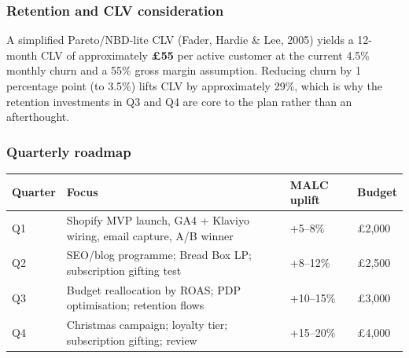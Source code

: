 \documentclass[
  11pt,
]{article}
\begin{document}
\subsubsection{Retention and CLV
consideration}\label{retention-and-clv-consideration}

A simplified Pareto/NBD-lite CLV (Fader, Hardie \& Lee, 2005) yields a
12-month CLV of approximately \textbf{£55} per active customer at the
current 4.5\% monthly churn and a 55\% gross margin assumption. Reducing
churn by 1 percentage point (to 3.5\%) lifts CLV by approximately 29\%,
which is why the retention investments in Q3 and Q4 are core to the plan
rather than an afterthought.

\subsubsection{Quarterly roadmap}\label{quarterly-roadmap}

\begin{longtable}[]{@{}
  >{\raggedright\arraybackslash}p{}
  >{\raggedright\arraybackslash}p{}
  >{\raggedright\arraybackslash}p{}
  >{\raggedright\arraybackslash}p{}@{}}
\toprule\noalign{}
\begin{minipage}[b]{\linewidth}\raggedright
Quarter
\end{minipage} & \begin{minipage}[b]{\linewidth}\raggedright
Focus
\end{minipage} & \begin{minipage}[b]{\linewidth}\raggedright
MALC uplift
\end{minipage} & \begin{minipage}[b]{\linewidth}\raggedright
Budget
\end{minipage} \\
\midrule\noalign{}
\endhead
\bottomrule\noalign{}
\endlastfoot
Q1 & Shopify MVP launch, GA4 + Klaviyo wiring, email capture, A/B winner
& +5--8\% & £2,000 \\
Q2 & SEO/blog programme; Bread Box LP; subscription gifting test &
+8--12\% & £2,500 \\
Q3 & Budget reallocation by ROAS; PDP optimisation; retention flows &
+10--15\% & £3,000 \\
Q4 & Christmas campaign; loyalty tier; subscription gifting; review &
+15--20\% & £4,000 \\
\end{longtable}
\end{document}
